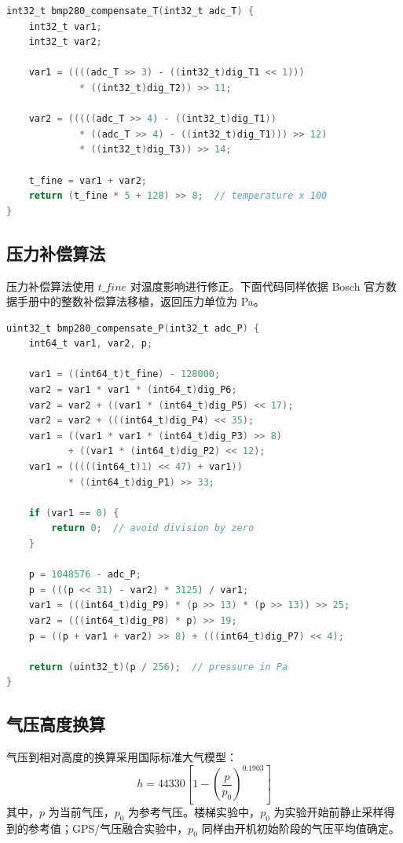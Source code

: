 \documentclass[UTF8,a4paper,12pt]{ctexart}
\begin{document}
\begin{lstlisting}[language=C,caption={Bosch BMP280 数据手册温度补偿算法移植}]
int32_t bmp280_compensate_T(int32_t adc_T) {
    int32_t var1;
    int32_t var2;

    var1 = ((((adc_T >> 3) - ((int32_t)dig_T1 << 1)))
             * ((int32_t)dig_T2)) >> 11;

    var2 = (((((adc_T >> 4) - ((int32_t)dig_T1))
             * ((adc_T >> 4) - ((int32_t)dig_T1))) >> 12)
             * ((int32_t)dig_T3)) >> 14;

    t_fine = var1 + var2;
    return (t_fine * 5 + 128) >> 8;  // temperature x 100
}
\end{lstlisting}

\subsection{压力补偿算法}

压力补偿算法使用 $t\_fine$ 对温度影响进行修正。下面代码同样依据 Bosch 官方数据手册中的整数补偿算法移植，返回压力单位为 Pa。

\begin{lstlisting}[language=C,caption={Bosch BMP280 数据手册压力补偿算法移植}]
uint32_t bmp280_compensate_P(int32_t adc_P) {
    int64_t var1, var2, p;

    var1 = ((int64_t)t_fine) - 128000;
    var2 = var1 * var1 * (int64_t)dig_P6;
    var2 = var2 + ((var1 * (int64_t)dig_P5) << 17);
    var2 = var2 + (((int64_t)dig_P4) << 35);
    var1 = ((var1 * var1 * (int64_t)dig_P3) >> 8)
           + ((var1 * (int64_t)dig_P2) << 12);
    var1 = (((((int64_t)1) << 47) + var1))
           * ((int64_t)dig_P1) >> 33;

    if (var1 == 0) {
        return 0;  // avoid division by zero
    }

    p = 1048576 - adc_P;
    p = (((p << 31) - var2) * 3125) / var1;
    var1 = (((int64_t)dig_P9) * (p >> 13) * (p >> 13)) >> 25;
    var2 = (((int64_t)dig_P8) * p) >> 19;
    p = ((p + var1 + var2) >> 8) + (((int64_t)dig_P7) << 4);

    return (uint32_t)(p / 256);  // pressure in Pa
}
\end{lstlisting}

\subsection{气压高度换算}

气压到相对高度的换算采用国际标准大气模型：
\begin{equation}
h = 44330 \left[ 1 - \left(\frac{p}{p_0}\right)^{0.1903} \right]
\end{equation}
其中，$p$ 为当前气压，$p_0$ 为参考气压。楼梯实验中，$p_0$ 为实验开始前静止采样得到的参考值；GPS/气压融合实验中，$p_0$ 同样由开机初始阶段的气压平均值确定。
\end{document}
